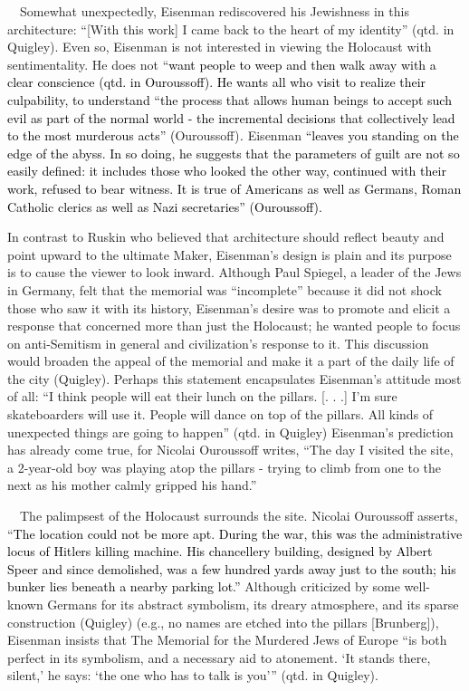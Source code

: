 \ \ Somewhat unexpectedly, Eisenman rediscovered his Jewishness in this
architecture: “[With this work] I came back to the heart of my
identity” (qtd. in Quigley).  Even so, Eisenman is not interested in
viewing the Holocaust with sentimentality.  He does not
“\textcolor{black}{want people to weep }\textcolor{black}{and then walk
away with a clear conscience{\textquotedbl} (qtd. in Ouroussoff).  He
wants all who visit to realize their culpability, to understand “the
process that allows human beings to accept such evil as part of the
normal world - the incremental decisions that collectively lead to the
most murderous acts” (}Ouroussoff)\textit{\textcolor{black}{. 
}}Eisenman\textcolor{black}{ “leaves you standing on the edge of the
abyss.  In so doing, he suggests that the parameters of guilt are not
so easily defined: it includes those who looked the other way,
continued with their work, refused to bear witness.  It is true of
Americans as well as Germans, Roman Catholic clerics as well as Nazi
secretaries” (Ouroussoff).  }

{\color{black}
In contrast to Ruskin who believed that architecture should reflect
beauty and point upward to the ultimate Maker, Eisenman’s design is
plain and its purpose is to cause the viewer to look inward.  Although
Paul Spiegel, a leader of the Jews in Germany, felt that the memorial
was “incomplete” because it did not shock those who saw it with its
history, Eisenman’s desire was to promote and elicit a response that
concerned more than just the Holocaust; he wanted people to focus on
anti-Semitism in general and civilization’s response to it.  This
discussion would broaden the appeal of the memorial and make it a part
of the daily life of the city (Quigley).  Perhaps this statement
encapsulates Eisenman’s attitude most of all:
\textcolor[rgb]{0.2,0.2,0.2}{“I think people will eat their lunch on
the pillars. [. . .] I’m sure skateboarders will use it.  People will
dance on top of the pillars.  All kinds of unexpected things are going
to happen” (qtd. in Quigley)  Eisenman’s prediction has already come
true, for Nicolai }Ouroussoff\textit{ }writes, “The day I visited the
site, a 2-year-old boy was playing atop the pillars - trying to climb
from one to the next as his mother calmly gripped his hand.”  }

\ \ The palimpsest of the Holocaust surrounds the site.  Nicolai
Ouroussoff asserts, “\textcolor{black}{The location could not be more
apt.  During the war, this was the administrative locus of
Hitler{\textquotesingle}s killing machine.  His chancellery building,
designed by Albert Speer and since demolished, was }\textcolor{black}{a
few hundred yards away just to the south; his bunker lies beneath a
nearby parking lot.”  }Although criticized by some well-known Germans
for its abstract symbolism, its dreary atmosphere, and its sparse
construction (Quigley) (e.g., no names are etched into the pillars
[Brunberg]), Eisenman insists that The Memorial for the Murdered Jews
of Europe “is both perfect in its symbolism, and a necessary aid to
atonement.  ‘It stands there, silent,’ he says: ‘the one who has to
talk is you’” (qtd. in Quigley).  

